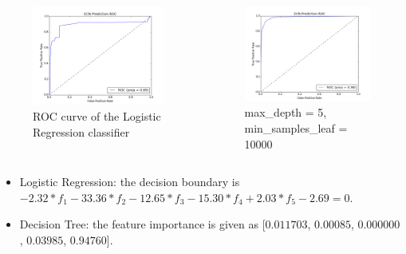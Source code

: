\documentclass{beamer}
\begin{document}
\begin{frame}
 \begin{columns}[c]
\begin{figure}
\centering
\includegraphics[width=6cm]{LRRoc.png}
\caption{ROC curve of the Logistic Regression classifier}
\label{LRRoc}
\end{figure}
 \begin{figure}
     \includegraphics[width=6cm]{DecisionTreeRoc.png}
\caption{max\_depth = 5, min\_samples\_leaf = 10000}
\label{DecisionTreeRoc}

   \end{figure}
\end{columns}
\begin{itemize}
\item Logistic Regression: the decision boundary is $ -2.32*f_{1} - 33.36*f_{2} - 12.65*f_{3} - 15.30*f_{4} + 2.03*f_{5} - 2.69 = 0$.
\item Decision Tree: the feature importance is given as [$0.011703$, $0.00085$, $0.000000$, $0.03985$, $0.94760$].
\end{itemize}
\end{frame}
\end{document}
